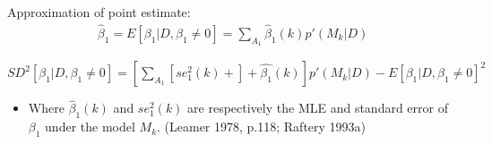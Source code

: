 \documentclass[
  ignorenonframetext,
]{beamer}
\providecommand{\tightlist}{%
  \setlength{\itemsep}{0pt}\setlength{\parskip}{0pt}}
\begin{document}
\begin{frame}{Approximation of point estimate:}
\protect\hypertarget{approximation-of-point-estimate}{}
\begin{align}
\hat{\beta}_1 = E[\beta_1|D, \beta_1\ne 0] = \sum\limits_{A_1} \hat{\beta}_1(k)p'(M_k|D)
\end{align}

\(SD^2[\beta_1|D, \beta_1\ne 0] =[\sum\limits_{A_1}[se_1^2(k)+]+\hat{\beta_1}(k)]p'(M_k|D) - E[\beta_1|D, \beta_1\ne 0]^2\)

\begin{itemize}
\tightlist
\item
  Where \(\hat{\beta}_1(k)\) and \(se_1^2(k)\) are respectively the MLE
  and standard error of \(\beta_1\) under the model \(M_k\). (Leamer
  1978, p.118; Raftery 1993a)
\end{itemize}
\end{frame}
\end{document}
